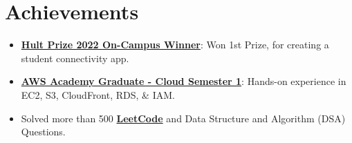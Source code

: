 \documentclass[letterpaper,11pt]{article}
\makeatletter
\newcommand{\resumeItem}[1]{
  \item\small{
    {#1 \vspace{-2pt}}
  }
}
\newcommand{\resumeProjectHeading}[2]{
    \item
    \begin{tabular*}{0.97\textwidth}{l@{\extracolsep{\fill}}r}
      \small#1 & #2 \\
    \end{tabular*}\vspace{-7pt}
}
\newcommand{\resumeSubHeadingListStart}{\begin{itemize}[leftmargin=0.15in, label={}]}
\newcommand{\resumeSubHeadingListEnd}{\end{itemize}}
\newcommand{\resumeItemListStart}{\begin{itemize}}
\newcommand{\resumeItemListEnd}{\end{itemize}\vspace{-5pt}}
\makeatother
\begin{document}

\section{Achievements}
 \begin{itemize}[leftmargin=0.15in, label={}]
    \small{\item{
        \resumeItemListStart
            \resumeItem{\textbf{\href{https://www.linkedin.com/posts/dshekhar17_hultprize2022-hultprizekiit-kiituniversity-activity-6899007358467743746-6hZ3}{Hult Prize 2022 On-Campus Winner}}: Won 1st Prize, for creating a student connectivity app.}

            \resumeItem{\textbf{\href{https://www.credly.com/go/vqTzHzec}{AWS Academy Graduate - Cloud Semester 1}}: Hands-on experience in EC2, S3, CloudFront, RDS, \& IAM.}

            \resumeItem{Solved more than 500 \textbf{\href{https://leetcode.com/dshekhar17/}{LeetCode}} and Data Structure and Algorithm (DSA) Questions.}
            
      \resumeItemListEnd
      
    }}
 \end{itemize}

%
\end{document}
